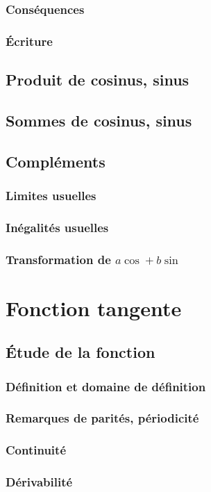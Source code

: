\documentclass[12pt,a4paper,french]{book}
\begin{document}
			\subsubsection{Conséquences}
			\subsubsection{Écriture}
		\subsection{Produit de cosinus, sinus}
		\subsection{Sommes de cosinus, sinus}
		\subsection{Compléments}
			\subsubsection{Limites usuelles}
			\subsubsection{Inégalités usuelles}
			\subsubsection{Transformation de $a\cos + b\sin$}
	\section{Fonction tangente}
		\subsection{Étude de la fonction}
			\subsubsection{Définition et domaine de définition}
			\subsubsection{Remarques de parités, périodicité}
			\subsubsection{Continuité}
			\subsubsection{Dérivabilité}
\end{document}
